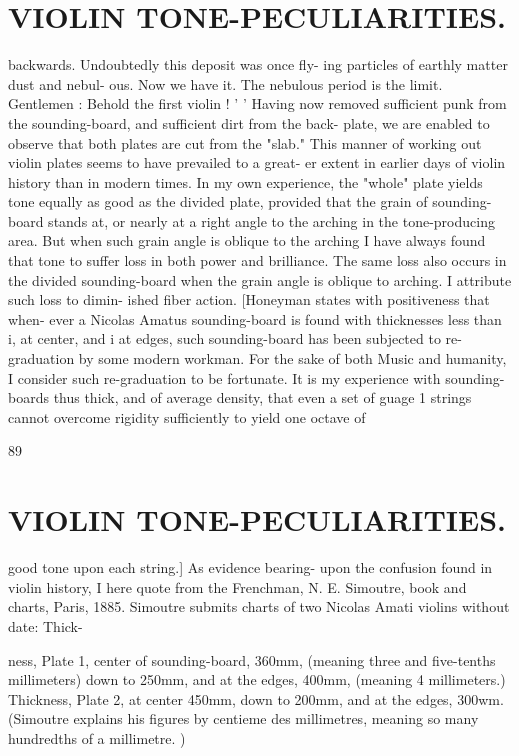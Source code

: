 \documentclass{article}
\begin{document}
\section*{VIOLIN TONE-PECULIARITIES.}
backwards. Undoubtedly this deposit was once fly- ing particles of earthly matter dust and nebul- ous. Now we have it. The nebulous period is the limit. Gentlemen : Behold the first violin ! ' ' Having now removed sufficient punk from the sounding-board, and sufficient dirt from the back- plate, we are enabled to observe that both plates are cut from the "slab." This manner of working out violin plates seems to have prevailed to a great- er extent in earlier days of violin history than in modern times. In my own experience, the "whole" plate yields tone equally as good as the divided plate, provided that the grain of sounding- board stands at, or nearly at a right angle to the arching in the tone-producing area. But when such grain angle is oblique to the arching I have always found that tone to suffer loss in both power and brilliance. The same loss also occurs in the divided sounding-board when the grain angle is oblique to arching. I attribute such loss to dimin- ished fiber action. [Honeyman states with positiveness that when- ever a Nicolas Amatus sounding-board is found with thicknesses less than i, at center, and i at edges, such sounding-board has been subjected to re-graduation by some modern workman. For the sake of both Music and humanity, I consider such re-graduation to be fortunate. It is my experience with sounding-boards thus thick, and of average density, that even a set of guage 1 strings cannot overcome rigidity sufficiently to yield one octave of

89

\section*{VIOLIN TONE-PECULIARITIES.}
good tone upon each string.] As evidence bearing- upon the confusion found in violin history, I here quote from the Frenchman, N. E. Simoutre, book and charts, Paris, 1885. Simoutre submits charts of two Nicolas Amati violins without date: Thick-

ness, Plate 1, center of sounding-board, 360mm, (meaning three and five-tenths millimeters) down to 250mm, and at the edges, 400mm, (meaning 4 millimeters.) Thickness, Plate 2, at center 450mm, down to 200mm, and at the edges, 300wm. (Simoutre explains his figures by centieme des millimetres, meaning so many hundredths of a millimetre. )
\end{document}
